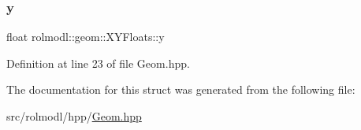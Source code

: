 \subsubsection{\texorpdfstring{y}{y}}
{\footnotesize\ttfamily float rolmodl\+::geom\+::\+X\+Y\+Floats\+::y}



Definition at line 23 of file Geom.\+hpp.



The documentation for this struct was generated from the following file\+:\begin{DoxyCompactItemize}
\item 
src/rolmodl/hpp/\mbox{\hyperlink{_geom_8hpp}{Geom.\+hpp}}\end{DoxyCompactItemize}
